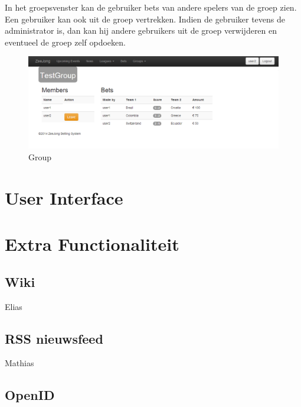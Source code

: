 \documentclass[11pt]{article}
\begin{document}
In het groepsvenster kan de gebruiker bets van andere spelers van de groep zien.  Een gebruiker kan ook uit de groep vertrekken.  Indien de gebruiker tevens de administrator is, dan kan hij andere gebruikers uit de groep verwijderen en eventueel de groep zelf opdoeken.\\

\begin{figure}[h!]
	\begin{center}
	\includegraphics[scale=0.4]{group.png}

	\caption{Group}
	\label{fig:group}
	\end{center}
\end{figure}

\section{User Interface}





\section{Extra Functionaliteit}


\subsection{Wiki}

Elias



\subsection{RSS nieuwsfeed}

Mathias



\subsection{OpenID}
\end{document}
